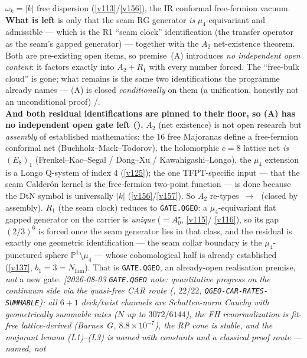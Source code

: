 \documentclass[11pt,a4paper]{article}
\newcommand{\Nfam}{N_{\mathrm{fam}}}
\newcommand{\PP}{\mathbb P^1}
\begin{document}
\begin{keybox}
$\omega_k{=}|k|$ free dispersion (\vref{v113}/\vref{v156}), the IR conformal free-fermion vacuum.
\textbf{What is left} is only that the seam RG generator \emph{is} $\mu_4$-equivariant and admissible ---
which is the R1 ``seam clock'' identification (the transfer operator as the seam's gapped generator) ---
together with the $A_2$ net-existence theorem. Both are pre-existing open items, so premise~(A) introduces
\emph{no independent open content}: it factors exactly into $A_2+R_1$ with every number forced. The
``free-bulk cloud'' is gone; what remains is the same two identifications the programme already names ---
(A) is closed \emph{conditionally} on them (a unification, honestly not an unconditional proof) \mE/\mO.
\smallskip\\
\noindent\textbf{And both residual identifications are pinned to their floor, so (A) has no independent open
gate left ().} $A_2$ (net existence) is not open research but
\emph{assembly} of established mathematics: the $16$ free Majoranas define a free-fermion conformal net
(Buchholz--Mack--Todorov), the holomorphic $c{=}8$ lattice net \emph{is} $(E_8)_1$ (Frenkel--Kac--Segal /
Dong--Xu / Kawahigashi--Longo), the $\mu_4$ extension is a Longo Q-system of index $4$ (\vref{v125}); the
one TFPT-specific input --- that the seam Calder\'on kernel is the free-fermion two-point function --- is
done because the DtN symbol is universally $|k|$ (\vref{v156}/\vref{v157}). So $A_2$ re-types
\mO$\,\to\,$\mC\ (closed by assembly). $R_1$ (the seam clock) reduces to \texttt{GATE.QGEO}: a
$\mu_4$-equivariant flat gapped generator on the carrier is \emph{unique} ($=A_0^\star$, \vref{v115}/%
\vref{v116}), so its gap $(2/3)^6$ is forced once the seam generator lies in that class, and the residual is
exactly one geometric identification --- the seam collar boundary is the $\mu_4$-punctured sphere
$\PP\setminus\mu_4$ --- whose cohomological half is already established (\vref{v137},
$b_1{=}3{=}\Nfam$). That is \texttt{GATE.QGEO}, an already-open realisation premise, \emph{not} a new gate.
\emph{[2026-08-03 \texttt{GATE.QGEO} note: quantitative progress on the continuum side via the quasi-free
CAR route (, $22/22$, \texttt{QGEO-CAR-RATES-SUMMABLE}): all $6{+}1$
deck/twist channels are Schatten-norm Cauchy with geometrically summable rates ($N$ up to $3072/6144$), the
FH renormalization is fit-free lattice-derived (Barnes~$G$, $8.8\times10^{-7}$), the RP cone is stable, and
the majorant lemma (L1)--(L3) is \emph{named} with constants and a classical proof route --- named, not
}
\end{keybox}
\end{document}
